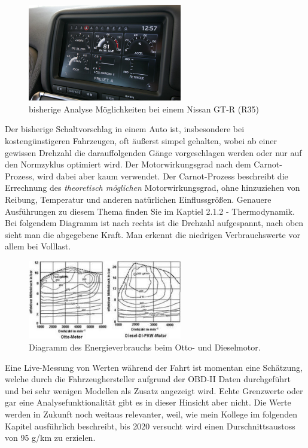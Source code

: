 \begin{figure}[!htb]\centering
	\includegraphics[width=0.6\textwidth]{images/gtrMultifunc}
	\caption{bisherige Analyse Möglichkeiten bei einem Nissan GT-R (R35) \cite{SIMR.CH1-Fahrstil-Analyse.GTRMultifunc}}\label{Fig:imgGTR}
\end{figure}

\newpage
Der bisherige Schaltvorschlag in einem Auto ist, insbesondere bei kostengünstigeren Fahrzeugen, oft äußerst simpel gehalten, wobei ab einer gewissen Drehzahl die darauffolgenden Gänge vorgeschlagen werden oder nur auf den Normzyklus optimiert wird. \cite{SIMR.CH1-Fahrstil-Analyse.Schaltempfehlung} Der Motorwirkungsgrad nach dem Carnot-Prozess, wird dabei aber kaum verwendet. Der Carnot-Prozess beschreibt die Errechnung des \textit{theoretisch möglichen} Motorwirkungsgrad, ohne hinzuziehen von Reibung, Temperatur und anderen natürlichen Einflussgrößen. \cite{SIMR.CH1-Fahrstil-Analyse.CarnotWirkungsgrad} Genauere Ausführungen zu diesem Thema finden Sie im Kaptiel 2.1.2 - Thermodynamik. 
Bei folgendem Diagramm ist nach rechts ist die Drehzahl aufgespannt, nach oben sieht man die abgegebene Kraft. Man erkennt die niedrigen Verbrauchswerte vor allem bei Volllast.

\begin{figure}[!htb]\centering
	\includegraphics[width=0.6\textwidth]{images/motorkennfeld}
	\caption{Diagramm des Energieverbrauchs beim Otto- und Dieselmotor. \cite{SIMR.CH1-Fahrstil-Analyse.Motorkennfeld}}\label{Fig:imgMotorkennfeld}
\end{figure}

Eine Live-Messung von  Werten während der Fahrt ist momentan eine Schätzung, welche durch die Fahrzeughersteller aufgrund der OBD-II Daten durchgeführt und bei sehr wenigen Modellen als Zusatz angezeigt wird. Echte Grenzwerte oder gar eine Analysefunktionalität gibt es in dieser Hinsicht aber nicht. Die  Werte werden in Zukunft noch weitaus relevanter, weil, wie mein Kollege im folgenden Kapitel ausführlich beschreibt, bis 2020 versucht wird einen Durschnittsaustoss von 95 g/km zu erzielen. \cite{SIMR.CH1-Fahrstil_Analyse.EUVerordCO2}

